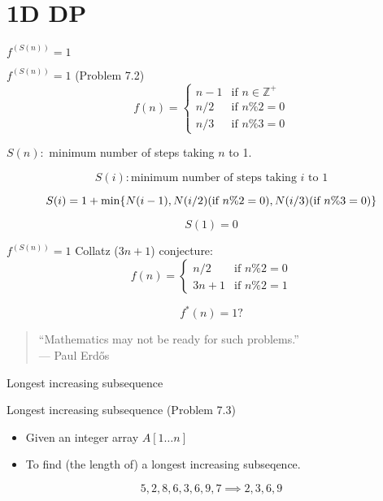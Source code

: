 \section{1D DP}

\begin{frame}{$f^{(S(n))} = 1$}
  \begin{exampleblock}{$f^{(S(n))} = 1$ (Problem 7.2)}
	\begin{displaymath}
	  f(n) = \begin{cases}
		n - 1 & \text{if } n \in \mathbb{Z}^{+} \\
		n / 2 & \text{if } n \% 2 = 0 \\
		n / 3 & \text{if } n \% 3 = 0
	  \end{cases}
	\end{displaymath}

	\centerline{$S(n):$ minimum number of steps taking $n$ to 1.}
  \end{exampleblock}

  \pause
  \[
	S(i): \text{minimum number of steps taking } i \text{ to } 1
  \]

  \pause
  \[
	S(i) = 1 + \min \{N(i-1), N(i/2) (\text{if } n\%2 = 0), N(i/3) (\text{if } n\%3 = 0)\}
  \]

  \[
	S(1) = 0
  \]
\end{frame}
\begin{frame}{$f^{(S(n))} = 1$}
  Collatz ($3n+1$) conjecture:
  \begin{displaymath}
	f(n) = \begin{cases}
	  n / 2 & \text{if } n \% 2 = 0 \\
	  3n + 1 & \text{if } n \% 2 = 1
	\end{cases}
  \end{displaymath}

  \[
	f^{\ast}(n) = 1 ?
  \]

  \pause
  \vspace{0.50cm}
  \begin{quote}
	``Mathematics may not be ready for such problems.''\\
	\hfill --- Paul Erdős
  \end{quote}
\end{frame}
\begin{frame}{Longest increasing subsequence}
  \begin{exampleblock}{Longest increasing subsequence (Problem 7.3)}
    \begin{itemize}
      \item Given an integer array $A[1 \ldots n]$
      \item To find (the length of) a longest increasing subseqence.
    \end{itemize}
  \end{exampleblock}

  \[
    5,2,8,6,3,6,9,7 \implies 2, 3, 6, 9
  \]
\end{frame}
